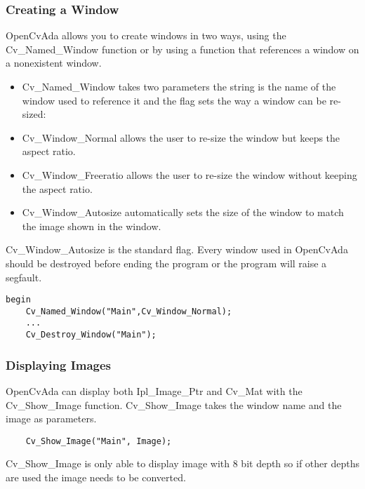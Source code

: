 \subsubsection{Creating a Window}
OpenCvAda allows you to create windows in two ways, using the Cv_Named_Window function or by using a function that references a window on a nonexistent window. 
\begin{itemize}
\item Cv_Named_Window takes two parameters the string is the name of the window used to reference it and the flag sets the way a window can be re-sized:
\item Cv_Window_Normal allows the user to re-size the window but keeps the aspect ratio.
\item Cv_Window_Freeratio allows the user to re-size the window without keeping the aspect ratio.
\item Cv_Window_Autosize automatically sets the size of the window to match the image shown in the window.
\end{itemize}
Cv_Window_Autosize is the standard flag. Every window used in OpenCvAda should be destroyed before ending the program or the program will raise a segfault.
\begin{lstlisting}
begin
	Cv_Named_Window("Main",Cv_Window_Normal);
	...
	Cv_Destroy_Window("Main");
\end{lstlisting}
\subsubsection{Displaying Images}
OpenCvAda can display both Ipl_Image_Ptr and Cv_Mat with the Cv_Show_Image function. Cv_Show_Image takes the window name and the image as parameters.
\begin{lstlisting}
	Cv_Show_Image("Main", Image);
\end{lstlisting}
Cv_Show_Image is only able to display image with 8 bit depth so if other depths are used the image needs to be converted.
